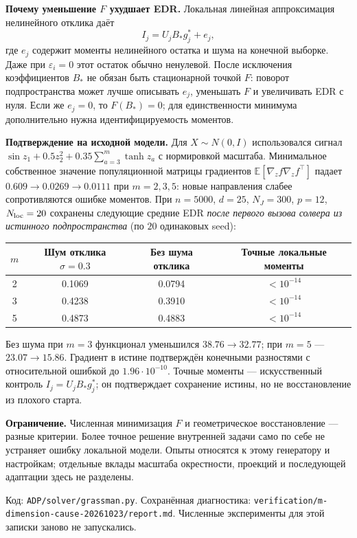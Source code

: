 \documentclass[10pt,a4paper]{article}
\begin{document}
\textbf{Почему уменьшение $F$ ухудшает EDR.}
Локальная линейная аппроксимация нелинейного отклика даёт
\[
 I_j=U_jB_*g_j^*+e_j,
\]
где $e_j$ содержит моменты нелинейного остатка и шума на конечной выборке.
Даже при $\varepsilon_i=0$ этот остаток обычно ненулевой.
После исключения коэффициентов $B_*$ не обязан быть стационарной точкой
$F$: поворот подпространства может лучше описывать $e_j$, уменьшать $F$
и увеличивать EDR с нуля. Если же $e_j=0$, то $F(B_*)=0$;
для единственности минимума дополнительно нужна идентифицируемость моментов.

\textbf{Подтверждение на исходной модели.}
Для $X\sim N(0,I)$ использовался сигнал
$\sin z_1+0.5z_2^2+0.35\sum_{a=3}^m\tanh z_a$ с нормировкой масштаба.
Минимальное собственное значение популяционной матрицы градиентов
$\mathbb E[\nabla_z f\nabla_z f^\top]$ падает
$0.609\to0.0269\to0.0111$ при $m=2,3,5$:
новые направления слабее сопротивляются ошибке моментов.
При $n=5000$, $d=25$, $N_J=300$, $p=12$, $N_{\rm loc}=20$
сохранены следующие средние EDR \emph{после первого вызова солвера
из истинного подпространства} (по $20$ одинаковых seed):
\begin{center}
\begin{tabular}{c|ccc}
 $m$ & Шум отклика $\sigma=0.3$ & Без шума отклика & Точные локальные моменты \\ \hline
 2 & 0.1069 & 0.0794 & $<10^{-14}$ \\
 3 & 0.4238 & 0.3910 & $<10^{-14}$ \\
 5 & 0.4873 & 0.4883 & $<10^{-14}$
\end{tabular}
\end{center}
\vspace{-5pt}
Без шума при $m=3$ функционал уменьшился $38.76\to32.77$;
при $m=5$ --- $23.07\to15.86$.
Градиент в истине подтверждён конечными разностями с относительной
ошибкой до $1.96\cdot10^{-10}$.
Точные моменты --- искусственный контроль $I_j=U_jB_*g_j^*$;
он подтверждает сохранение истины, но не восстановление из плохого старта.

\textbf{Ограничение.}
Численная минимизация $F$ и геометрическое восстановление --- разные
критерии. Более точное решение внутренней задачи само по себе не устраняет
ошибку локальной модели. Опыты относятся к этому генератору и настройкам;
отдельные вклады масштаба окрестности, проекций и последующей адаптации
здесь не разделены.

\vfill
{\footnotesize
Код: \texttt{ADP/solver/grassman.py}.
Сохранённая диагностика: \texttt{verification/m-dimension-cause-20261023/report.md}.
Численные эксперименты для этой записки заново не запускались.}
\end{document}
